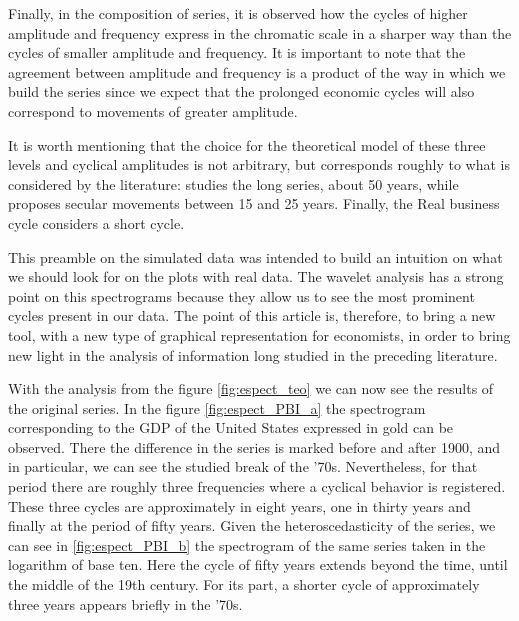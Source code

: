 \documentclass[a4paper,10cpi]{article}
\begin{document}
	
	Finally, in the composition of series, it is observed how the cycles of higher amplitude and frequency express in the chromatic scale in a sharper way than the cycles of smaller amplitude and frequency. It is important to note that the agreement between amplitude and frequency is a product of the way in which we build the series since we expect that the prolonged economic cycles will also correspond to movements of greater amplitude.
	
	It is worth mentioning that the choice for the theoretical model of these three levels and cyclical amplitudes is not arbitrary, but corresponds roughly to what is considered by the literature: \cite{kondratieff1979long} studies the long series, about 50 years, while \cite {kuznets1930secular} proposes secular movements between 15 and 25 years. Finally, the Real business cycle \citep{kydland1982time} considers a short cycle.
	
	This preamble on the simulated data was intended to build an intuition on what we should look for on the plots with real data. The wavelet analysis has a strong point on this spectrograms because they allow us to see the most prominent cycles present in our data. The point of this article is, therefore, to bring a new tool, with a new type of graphical representation for economists, in order to bring new light in the analysis of information long studied in the preceding literature.
	
	
	With the analysis from the figure \ref{fig:espect_teo} we can now see the results of the original series. In the figure \ref{fig:espect_PBI_a} the spectrogram corresponding to the GDP of the United States expressed in gold can be observed. There the difference in the series is marked before and after 1900, and in particular, we can see the studied break of the '70s. Nevertheless, for that period there are roughly three frequencies where a cyclical behavior is registered. These three cycles are approximately in eight years, one in thirty years and finally at the period of fifty years. Given the heteroscedasticity of the series, we can see in \ref{fig:espect_PBI_b} the spectrogram of the same series taken in the logarithm of base ten. Here the cycle of fifty years extends beyond the time, until the middle of the 19th century. For its part, a shorter cycle of approximately three years appears briefly in the '70s.
	
\end{document}

